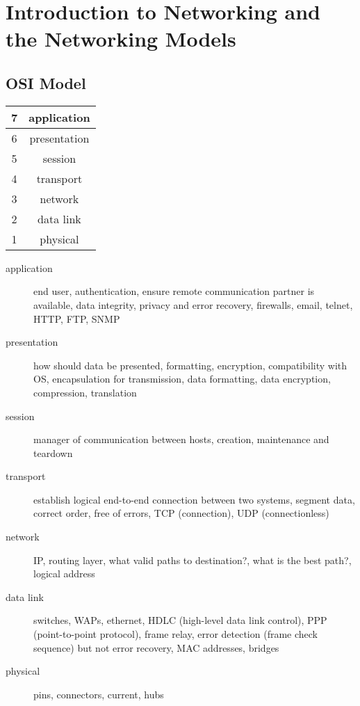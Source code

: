 \section{Introduction to Networking and the Networking Models}

\subsection{OSI Model}

\begin{tabular}{ | c | c | }
\hline
7 & application \\ \hline
6 & presentation \\ \hline
5 & session \\ \hline
4 & transport \\ \hline
3 & network \\ \hline
2 & data link \\ \hline
1 & physical \\ \hline
\end{tabular}

\begin{description}

\item[application]
end user, authentication, ensure remote communication partner is available,
data integrity, privacy and error recovery, firewalls, email, telnet, HTTP,
FTP, SNMP

\item[presentation]
how should data be presented, formatting, encryption, compatibility with OS,
encapsulation for transmission, data formatting, data encryption, compression,
translation

\item[session]
manager of communication between hosts, creation, maintenance and teardown

\item[transport]
establish logical end-to-end connection between two systems, segment data,
correct order, free of errors, TCP (connection), UDP (connectionless)

\item[network]
IP, routing layer, what valid paths to destination?, what is the best path?,
logical address

\item[data link]
switches, WAPs, ethernet, HDLC (high-level data link control), PPP
(point-to-point protocol), frame relay, error detection (frame check sequence)
but not error recovery, MAC addresses, bridges

\item[physical]
pins, connectors, current, hubs

\end{description}

